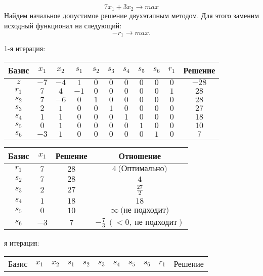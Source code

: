 \documentclass{article}%
\begin{document}
\[%
7x_{1}+3x_{2}  \to max%
\]%
Найдем начальное допустимое решение двухэтапным методом. Для этого заменим исходный функционал на следующий: %
\[%
-r_{1}\to max.%
\]%
\begin{flushleft}%
1{-}я итерация: %
\newline%
\newline%
\renewcommand{\arraystretch}{1.3}%
\begin{tabular}{|c|ccccccccc|c|}%
\hline%
Базис&$x_{1}$&$x_{2}$&$s_{1}$&$s_{2}$&$s_{3}$&$s_{4}$&$s_{5}$&$s_{6}$&$r_{1}$&Решение\\%
\hline%
$z$&$-7$&$-4$&$1$&$0$&$0$&$0$&$0$&$0$&$0$&$-28$\\%
\hline%
$r_{1}$&$7$&$4$&$-1$&$0$&$0$&$0$&$0$&$0$&$1$&$28$\\%
$s_{2}$&$7$&$-6$&$0$&$1$&$0$&$0$&$0$&$0$&$0$&$28$\\%
$s_{3}$&$2$&$1$&$0$&$0$&$1$&$0$&$0$&$0$&$0$&$27$\\%
$s_{4}$&$1$&$1$&$0$&$0$&$0$&$1$&$0$&$0$&$0$&$18$\\%
$s_{5}$&$0$&$1$&$0$&$0$&$0$&$0$&$1$&$0$&$0$&$10$\\%
$s_{6}$&$-3$&$1$&$0$&$0$&$0$&$0$&$0$&$1$&$0$&$7$\\%
\hline%
\end{tabular}%
\newline%
\newline%
\newline%
\begin{tabular}{|cccc|}%
\hline%
Базис&$x_{1}$&Решение&Отношение\\%
\hline%
$r_{1}$&$7$&$28$&$4\: \text{(Оптимально)}$\\%
$s_{2}$&$7$&$28$&$4$\\%
$s_{3}$&$2$&$27$&$\frac{27}{2}$\\%
$s_{4}$&$1$&$18$&$18$\\%
$s_{5}$&$0$&$10$&$\infty \: \text{(не подходит)}$\\%
$s_{6}$&$-3$&$7$&$-\frac{7}{3}\: (< 0, \: \text{не подходит})$\\%
\hline%
\end{tabular}%
\newline%
\newline%
я итерация: %
\newline%
\newline%
\renewcommand{\arraystretch}{1.3}%
\begin{tabular}{|c|ccccccccc|c|}%
\hline%
Базис&$x_{1}$&$x_{2}$&$s_{1}$&$s_{2}$&$s_{3}$&$s_{4}$&$s_{5}$&$s_{6}$&$r_{1}$&Решение\\%

\end{tabular}
\end{flushleft}
\end{document}
